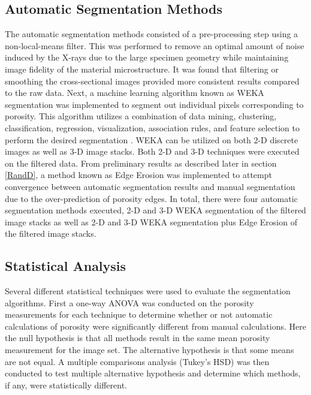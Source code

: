 \documentclass[11pt, twocolumn]{article}
\begin{document}
\subsection{Automatic Segmentation Methods}
The automatic segmentation methods consisted of a pre-processing step using a non-local-means filter. This was performed to remove an optimal amount of noise induced by the X-rays due to the large specimen geometry while maintaining image fidelity of the material microstructure. It was found that filtering or smoothing the cross-sectional images provided more consistent results compared to the raw data. Next, a machine learning algorithm known as WEKA segmentation was implemented to segment out individual pixels corresponding to porosity. This algorithm utilizes a combination of data mining, clustering, classification, regression, visualization, association rules, and feature selection to perform the desired segmentation \cite{Weka}. WEKA can be utilized on both 2-D discrete images as well as 3-D image stacks. Both 2-D and 3-D techniques were executed on the filtered data. From preliminary results as described later in section \ref{RandD}, a method known as Edge Erosion was implemented to attempt convergence between automatic segmentation results and manual segmentation due to the over-prediction of porosity edges. In total, there were four automatic segmentation methods executed, 2-D and 3-D WEKA segmentation of the filtered image stacks as well as 2-D and 3-D WEKA segmentation plus Edge Erosion of the filtered image stacks.

\subsection{Statistical Analysis} 
Several different statistical techniques were used to evaluate the segmentation algorithms. First a one-way ANOVA was conducted on the porosity measurements for each technique to determine whether or not automatic calculations of porosity were significantly different from manual calculations. Here the null hypothesis is that all methods result in the same mean porosity measurement for the image set. The alternative hypothesis is that some means are not equal. A multiple comparisons analysis (Tukey's HSD) was then conducted to test multiple alternative hypothesis and determine which methods, if any, were statistically different.\\
\end{document}
